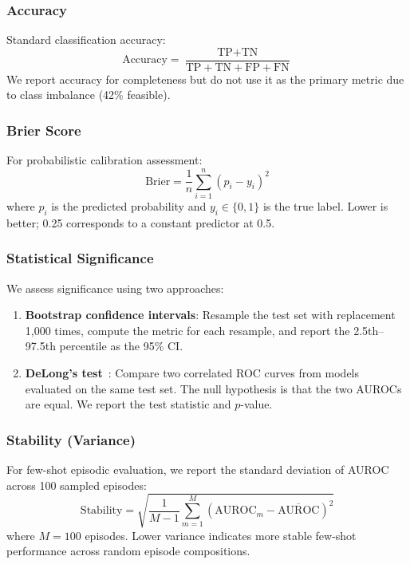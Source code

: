 \subsubsection{Accuracy}

Standard classification accuracy:
\begin{equation}
\text{Accuracy} = \frac{\text{TP} + \text{TN}}{\text{TP} + \text{TN} + \text{FP} + \text{FN}}
\end{equation}
We report accuracy for completeness but do not use it as the primary metric due to class imbalance (42\% feasible).

\subsubsection{Brier Score}

For probabilistic calibration assessment:
\begin{equation}
\text{Brier} = \frac{1}{n} \sum_{i=1}^{n} (p_i - y_i)^2
\end{equation}
where $p_i$ is the predicted probability and $y_i \in \{0,1\}$ is the true label. Lower is better; 0.25 corresponds to a constant predictor at 0.5.

\subsubsection{Statistical Significance}

We assess significance using two approaches:
\begin{enumerate}
\item \textbf{Bootstrap confidence intervals}: Resample the test set with replacement 1,000 times, compute the metric for each resample, and report the 2.5th--97.5th percentile as the 95\% CI.
\item \textbf{DeLong's test}~\cite{delong1988comparing}: Compare two correlated ROC curves from models evaluated on the same test set. The null hypothesis is that the two AUROCs are equal. We report the test statistic and $p$-value.
\end{enumerate}

\subsubsection{Stability (Variance)}

For few-shot episodic evaluation, we report the standard deviation of AUROC across 100 sampled episodes:
\begin{equation}
\text{Stability} = \sqrt{\frac{1}{M-1}\sum_{m=1}^{M}(\text{AUROC}_m - \overline{\text{AUROC}})^2}
\end{equation}
where $M = 100$ episodes. Lower variance indicates more stable few-shot performance across random episode compositions.

